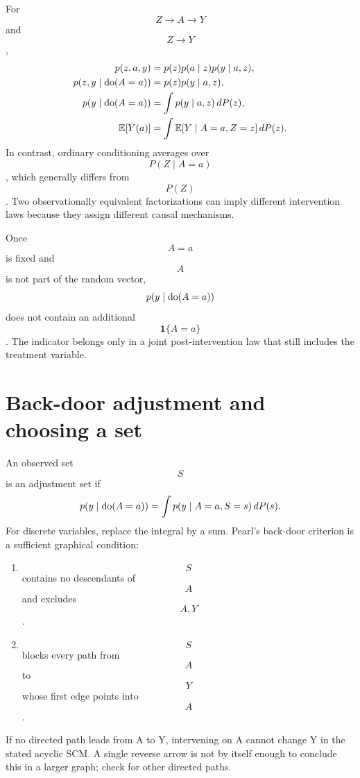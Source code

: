 For $$Z\to A\to Y$$ and $$Z\to Y$$,
\begin{align}
p(z,a,y)&=p(z)p(a\mid z)p(y\mid a,z),\\
p(z,y\mid\operatorname{do}(A=a))&=p(z)p(y\mid a,z),\\
p(y\mid\operatorname{do}(A=a))&=\int p(y\mid a,z)\,dP(z),\\
\mathbb E[Y(a)]&=\int\mathbb E[Y\mid A=a,Z=z]\,dP(z).
\end{align}
In contrast, ordinary conditioning averages over $$P(Z\mid A=a)$$, which generally differs from $$P(Z)$$. Two observationally equivalent factorizations can imply different intervention laws because they assign different causal mechanisms.
\begin{correction}
Once $$A=a$$ is fixed and $$A$$ is not part of the random vector, $$p(y\mid\operatorname{do}(A=a))$$ does not contain an additional $$\mathbf1\{A=a\}$$. The indicator belongs only in a joint post-intervention law that still includes the treatment variable.
\end{correction}

\section{Back-door adjustment and choosing a set}
An observed set $$S$$ is an adjustment set if
\begin{equation}
p(y\mid\operatorname{do}(A=a))=\int p(y\mid A=a,S=s)\,dP(s).
\end{equation}
For discrete variables, replace the integral by a sum. Pearl's back-door criterion is a sufficient graphical condition:
\begin{enumerate}
\item $$S$$ contains no descendants of $$A$$ and excludes $$A,Y$$.
\item $$S$$ blocks every path from $$A$$ to $$Y$$ whose first edge points into $$A$$.
\end{enumerate}
If no directed path leads from A to Y, intervening on A cannot change Y in the stated acyclic SCM. A single reverse arrow is not by itself enough to conclude this in a larger graph; check for other directed paths.

